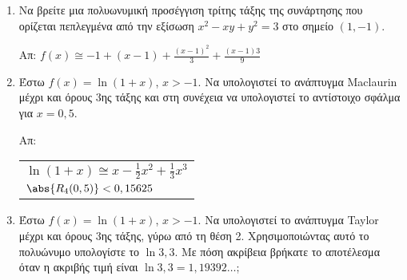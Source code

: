 \begin{enumerate}
	\item Να βρείτε μια πολυωνυμική προσέγγιση τρίτης τάξης της
		συνάρτησης που ορίζεται πεπλεγμένα από την εξίσωση $ x^{2} - xy + y^{2}
		= 3$ στο σημείο $ (1,-1) $.

		\hfill Απ: $f(x) \cong -1 + (x-1) + \frac{(x-1)^{2}}{3} +
		\frac{(x-1){3}}{9}$

	\item Έστω $ f(x) = \ln{(1+x)} $, $ x>-1 $. Να υπολογιστεί το ανάπτυγμα
		Maclaurin μέχρι και όρους 3ης τάξης και στη συνέχεια να
		υπολογιστεί το αντίστοιχο σφάλμα για $ x = 0,5 $.

		\hfill Απ: \begin{tabular}{l}
			$ \ln(1+x) \cong x - \frac{1}{2} x^{2} + \frac{1}{3}x^{3} $ \\
			$ \abs{R_{4}(0,5)} < 0,15625 $	
		\end{tabular}

	\item Έστω $ f(x) = \ln{(1+x)} $, $ x>-1 $. Να υπολογιστεί το ανάπτυγμα
		Taylor μέχρι και όρους 3ης τάξης, γύρω από τη θέση 2. Χρησιμοποιώντας
        αυτό το πολυώνυμο υπολογίστε το $ \ln{3,3} $. Με πόση ακρίβεια βρήκατε 
        το αποτέλεσμα όταν η ακριβής τιμή είναι $ \ln{3,3} = 1,19392\ldots $;


\end{enumerate}




